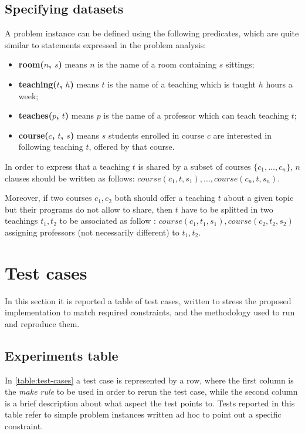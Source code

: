 \documentclass[10pt,a4paper]{article} %
\begin{document}
    \subsection{Specifying datasets}
    A problem instance can be defined using the following predicates, which
    are quite similar to statements expressed in the problem analysis:
    \begin{itemize}
        \item \textbf{room($n$, $s$)} means $n$ is the name
            of a room containing $s$ sittings;
        \item \textbf{teaching($t$, $h$)} means $t$ is the name
            of a teaching which is taught $h$ hours a week;
        \item \textbf{teaches($p$, $t$)} means $p$ is the name
            of a professor which can teach teaching $t$;
        \item \textbf{course($c$, $t$, $s$)} means $s$ students
            enrolled in course $c$ are interested in following
            teaching $t$, offered by that course.
    \end{itemize}
    In order to express that a teaching $t$ is shared by a subset of
    courses $\lbrace c_1, \ldots, c_n \rbrace$, $n$ clauses should be written
    as follows: $ course(c_1, t, s_1), \ldots, course(c_n, t, s_n)$.

    Moreover, if two courses $c_1, c_2$ both should offer a teaching $t$ about
    a given topic but their programs do not allow to share, then $t$
    have to be splitted in two teachings $t_1, t_2$ to be associated as follow :
    $course(c_1, t_1, s_1), course(c_2, t_2, s_2)$
    assigning professors (not necessarily different) to $t_1, t_2$.

    \section{Test cases}
    In this section it is reported a table of test cases, written to stress
    the proposed implementation to match required constraints,
    and the methodology used to run and reproduce them.

    \subsection{Experiments table}
    In \autoref{table:test-cases} a test case is represented by a row, where
    the first column is the \emph{make rule} to be used in order to rerun the
    test case, while the second column is a brief description about what
    aspect the test points to. Tests reported in this table refer to simple
    problem instances written ad hoc to point out a specific constraint.
\end{document}
